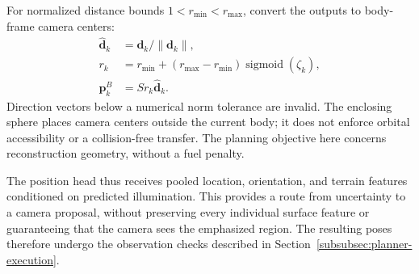 For normalized distance bounds $1<r_{\min}<r_{\max}$, convert the outputs to body-frame camera centers:
\begin{equation}
    \begin{aligned}
        \hat{\mathbf d}_k&=\mathbf d_k/\|\mathbf d_k\|,\\
        r_k&=r_{\min}+(r_{\max}-r_{\min})\operatorname{sigmoid}(\zeta_k),\\
        \mathbf p_k^B&=S r_k\hat{\mathbf d}_k.
    \end{aligned}
    \label{eq:planner-camera-position}
\end{equation}
Direction vectors below a numerical norm tolerance are invalid. The enclosing sphere places camera centers outside the current body; it does not enforce orbital accessibility or a collision-free transfer. The planning objective here concerns reconstruction geometry, without a fuel penalty.

The position head thus receives pooled location, orientation, and terrain features conditioned on predicted illumination. This provides a route from uncertainty to a camera proposal, without preserving every individual surface feature or guaranteeing that the camera sees the emphasized region. The resulting poses therefore undergo the observation checks described in Section~\ref{subsubsec:planner-execution}.

